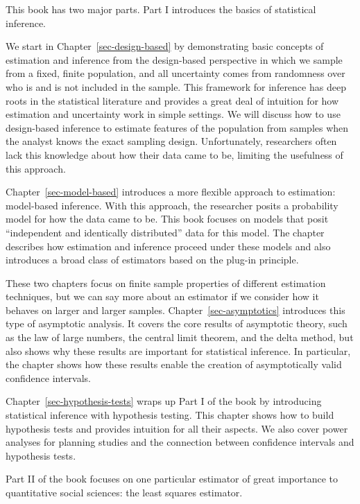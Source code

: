 \documentclass[
  13pt,
  letterpaper,
  DIV=11,
  numbers=noendperiod]{scrreprt}
\theoremstyle{definition}
\theoremstyle{definition}
\theoremstyle{plain}
\theoremstyle{remark}
\begin{document}

This book has two major parts. Part I introduces the basics of
statistical inference.

We start in Chapter~\ref{sec-design-based} by demonstrating basic
concepts of estimation and inference from the design-based perspective
in which we sample from a fixed, finite population, and all uncertainty
comes from randomness over who is and is not included in the sample.
This framework for inference has deep roots in the statistical
literature and provides a great deal of intuition for how estimation and
uncertainty work in simple settings. We will discuss how to use
design-based inference to estimate features of the population from
samples when the analyst knows the exact sampling design. Unfortunately,
researchers often lack this knowledge about how their data came to be,
limiting the usefulness of this approach.

Chapter~\ref{sec-model-based} introduces a more flexible approach to
estimation: model-based inference. With this approach, the researcher
posits a probability model for how the data came to be. This book
focuses on models that posit ``independent and identically distributed''
data for this model. The chapter describes how estimation and inference
proceed under these models and also introduces a broad class of
estimators based on the plug-in principle.

These two chapters focus on finite sample properties of different
estimation techniques, but we can say more about an estimator if we
consider how it behaves on larger and larger samples.
Chapter~\ref{sec-asymptotics} introduces this type of asymptotic
analysis. It covers the core results of asymptotic theory, such as the
law of large numbers, the central limit theorem, and the delta method,
but also shows why these results are important for statistical
inference. In particular, the chapter shows how these results enable the
creation of asymptotically valid confidence intervals.

Chapter~\ref{sec-hypothesis-tests} wraps up Part I of the book by
introducing statistical inference with hypothesis testing. This chapter
shows how to build hypothesis tests and provides intuition for all their
aspects. We also cover power analyses for planning studies and the
connection between confidence intervals and hypothesis tests.

Part II of the book focuses on one particular estimator of great
importance to quantitative social sciences: the least squares estimator.
\end{document}
